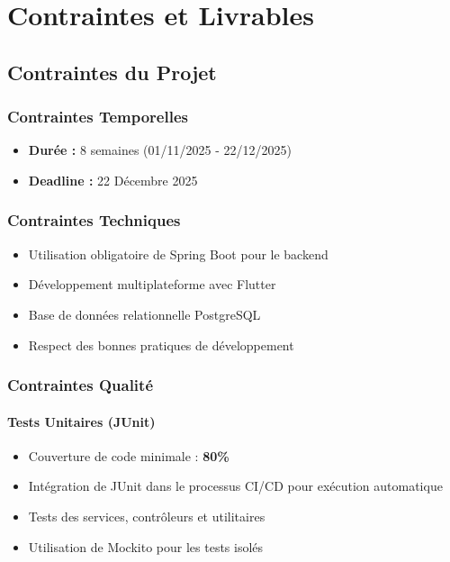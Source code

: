 \documentclass[12pt,a4paper]{report}
\begin{document}
\newpage

\chapter{Contraintes et Livrables}

\section{Contraintes du Projet}

\subsection{Contraintes Temporelles}
\begin{itemize}
    \item \textbf{Durée :} 8 semaines (01/11/2025 - 22/12/2025)
    \item \textbf{Deadline :} 22 Décembre 2025
\end{itemize}

\subsection{Contraintes Techniques}
\begin{itemize}
    \item Utilisation obligatoire de Spring Boot pour le backend
    \item Développement multiplateforme avec Flutter
    \item Base de données relationnelle PostgreSQL
    \item Respect des bonnes pratiques de développement
\end{itemize}

\subsection{Contraintes Qualité}

\subsubsection{Tests Unitaires (JUnit)}
\begin{itemize}
    \item Couverture de code minimale : \textbf{80\%}
    \item Intégration de JUnit dans le processus CI/CD pour exécution automatique
    \item Tests des services, contrôleurs et utilitaires
    \item Utilisation de Mockito pour les tests isolés
\end{itemize}
\end{document}
